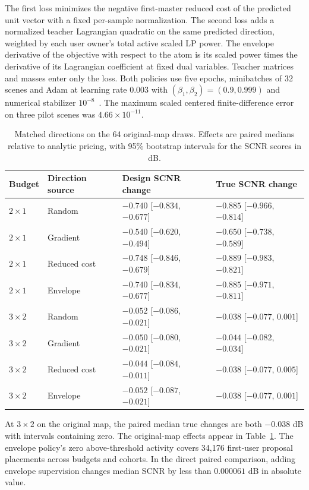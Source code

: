 \documentclass[journal]{IEEEtran}
\begin{document}
The first loss minimizes the negative first-master reduced cost of the predicted unit vector with a fixed per-sample normalization. The second loss adds a normalized teacher Lagrangian quadratic on the same predicted direction, weighted by each user owner's total active scaled LP power. The envelope derivative of the objective with respect to the atom is its scaled power times the derivative of its Lagrangian coefficient at fixed dual variables. Teacher matrices and masses enter only the loss. Both policies use five epochs, minibatches of 32 scenes and Adam at learning rate 0.003 with \((\beta_1,\beta_2)=(0.9,0.999)\) and numerical stabilizer \(10^{-8}\)~\cite{adam}. The maximum scaled centered finite-difference error on three pilot scenes was \(4.66\times10^{-11}\).

\begin{table}[t]
\caption{Matched directions on the 64 original-map draws. Effects are paired medians relative to analytic pricing, with 95\% bootstrap intervals for the SCNR scores in dB.}
\label{tab:learning-extra}
\centering\footnotesize
\begin{tabular}{@{}llll@{}}
\toprule
Budget & Direction source & Design SCNR change & True SCNR change\\
\midrule
$2\times1$ & Random & $-0.740$ [$-0.834$, $-0.677$] & $-0.885$ [$-0.966$, $-0.814$] \\
$2\times1$ & Gradient & $-0.540$ [$-0.620$, $-0.494$] & $-0.650$ [$-0.738$, $-0.589$] \\
$2\times1$ & Reduced cost & $-0.748$ [$-0.846$, $-0.679$] & $-0.889$ [$-0.983$, $-0.821$] \\
$2\times1$ & Envelope & $-0.740$ [$-0.834$, $-0.677$] & $-0.885$ [$-0.971$, $-0.811$] \\
$3\times2$ & Random & $-0.052$ [$-0.086$, $-0.021$] & $-0.038$ [$-0.077$, $0.001$] \\
$3\times2$ & Gradient & $-0.050$ [$-0.080$, $-0.021$] & $-0.044$ [$-0.082$, $-0.034$] \\
$3\times2$ & Reduced cost & $-0.044$ [$-0.084$, $-0.011$] & $-0.038$ [$-0.077$, $0.005$] \\
$3\times2$ & Envelope & $-0.052$ [$-0.087$, $-0.021$] & $-0.038$ [$-0.077$, $0.001$] \\
\bottomrule
\end{tabular}
\end{table}

At \(3\times2\) on the original map, the paired median true changes are both \(-0.038\) dB with intervals containing zero. The original-map effects appear in Table~\ref{tab:learning-extra}. The envelope policy's zero above-threshold activity covers 34,176 first-user proposal placements across budgets and cohorts. In the direct paired comparison, adding envelope supervision changes median SCNR by less than \(0.000061\) dB in absolute value.
\end{document}
